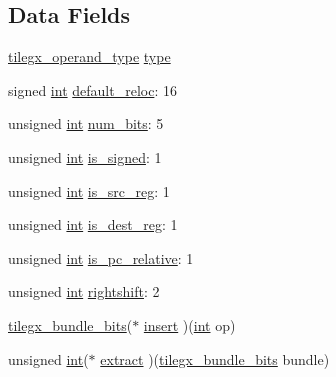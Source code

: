 \subsection*{Data Fields}
\begin{DoxyCompactItemize}
\item 
\hyperlink{sljitNativeTILEGX-encoder_8c_adf35607db075a45d00f98772ffd8edaa}{tilegx\+\_\+operand\+\_\+type} \hyperlink{structtilegx__operand_ac620d9276a7d3eb83e2ef4c7e70f63c9}{type}
\item 
signed \hyperlink{pcre_8txt_a42dfa4ff673c82d8efe7144098fbc198}{int} \hyperlink{structtilegx__operand_a960691baf2eaf779c1bc06fd69a31cc6}{default\+\_\+reloc}\+: 16
\item 
unsigned \hyperlink{pcre_8txt_a42dfa4ff673c82d8efe7144098fbc198}{int} \hyperlink{structtilegx__operand_a1a5b0f4c6dd7269285bbf5f5229cb280}{num\+\_\+bits}\+: 5
\item 
unsigned \hyperlink{pcre_8txt_a42dfa4ff673c82d8efe7144098fbc198}{int} \hyperlink{structtilegx__operand_a14b2fc69c3a32c56040287f936ac9d8f}{is\+\_\+signed}\+: 1
\item 
unsigned \hyperlink{pcre_8txt_a42dfa4ff673c82d8efe7144098fbc198}{int} \hyperlink{structtilegx__operand_af5419dfe2cfbafac7a20fd663e6ebb1f}{is\+\_\+src\+\_\+reg}\+: 1
\item 
unsigned \hyperlink{pcre_8txt_a42dfa4ff673c82d8efe7144098fbc198}{int} \hyperlink{structtilegx__operand_a5de47e15ec0d47a5b792843725669286}{is\+\_\+dest\+\_\+reg}\+: 1
\item 
unsigned \hyperlink{pcre_8txt_a42dfa4ff673c82d8efe7144098fbc198}{int} \hyperlink{structtilegx__operand_aa130d146e87853779d1d63d777e494dd}{is\+\_\+pc\+\_\+relative}\+: 1
\item 
unsigned \hyperlink{pcre_8txt_a42dfa4ff673c82d8efe7144098fbc198}{int} \hyperlink{structtilegx__operand_a6e8b6f614885abd04266646e9dd48cdd}{rightshift}\+: 2
\item 
\hyperlink{sljitNativeTILEGX-encoder_8c_abbcf9d5abf989cd724d5ac2efdd9b6f1}{tilegx\+\_\+bundle\+\_\+bits}($\ast$ \hyperlink{structtilegx__operand_a3e71b6d7a3cd23a0d849ce23d10928cb}{insert} )(\hyperlink{pcre_8txt_a42dfa4ff673c82d8efe7144098fbc198}{int} op)
\item 
unsigned \hyperlink{pcre_8txt_a42dfa4ff673c82d8efe7144098fbc198}{int}($\ast$ \hyperlink{structtilegx__operand_a766d8daeb988fde8b210faf67d342129}{extract} )(\hyperlink{sljitNativeTILEGX-encoder_8c_abbcf9d5abf989cd724d5ac2efdd9b6f1}{tilegx\+\_\+bundle\+\_\+bits} bundle)
\end{DoxyCompactItemize}


